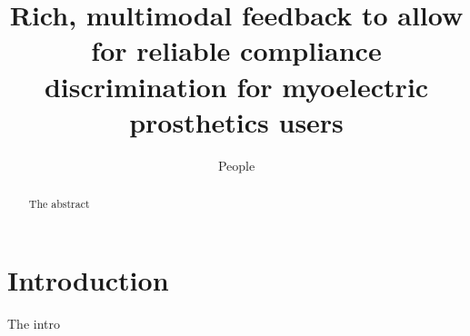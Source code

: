 \documentclass[10pt,technote]{IEEEtran}
\title{Rich, multimodal feedback to allow for reliable compliance discrimination for myoelectric prosthetics users }
\author{People}
\begin{document}
\maketitle
\begin{abstract}
The abstract
\end{abstract}

\section{Introduction}

The intro
%
%
\end{document}

